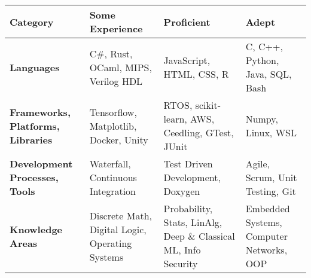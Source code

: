 \documentclass[9pt]{developercv} %
\begin{document}

\begin{table}[h!]
	\begin{tabularx}{\textwidth}{|>{\centering\arraybackslash}X|>{\centering\arraybackslash}X|>{\centering\arraybackslash}X|>{\centering\arraybackslash}X|}
		\hline
		\textbf{Category} & \textbf{Some Experience} & \textbf{Proficient} & \textbf{Adept} \\ 
		\hline
		\textbf{Languages} & C\#, Rust, OCaml, MIPS, Verilog HDL & JavaScript, HTML, CSS, R & C, C++, Python, Java, SQL, Bash \\ 
		\hline 
		\textbf{Frameworks, Platforms, Libraries} & Tensorflow, Matplotlib, Docker, Unity & RTOS, scikit-learn, AWS, Ceedling, GTest, JUnit & Numpy, Linux, WSL \\
		\hline
		\textbf{Development Processes, Tools} & Waterfall, Continuous Integration & Test Driven Development, Doxygen & Agile, Scrum, Unit Testing, Git \\
		\hline
		\textbf{Knowledge Areas} & Discrete Math, Digital Logic, Operating Systems & Probability, Stats, LinAlg, Deep \& Classical ML, Info Security & Embedded Systems, Computer Networks, OOP \\
		\hline
	\end{tabularx}
\end{table}


\end{document}
